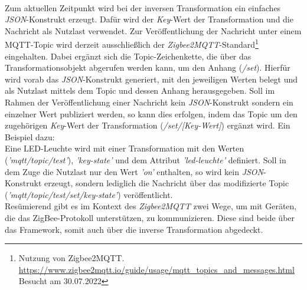     \\
    \linebreak
    Zum aktuellen Zeitpunkt wird bei der inversen Transformation ein einfaches \textit{JSON}-Konstrukt erzeugt. Dafür wird der 
    \textit{Key}-Wert der Transformation und die Nachricht als Nutzlast verwendet. Zur Veröffentlichung der Nachricht unter einem 
    \acs{MQTT}-Topic wird derzeit ausschließlich der \textit{Zigbee2MQTT}-Standard\footnote{Nutzung von Zigbee2MQTT. \url{https://www.zigbee2mqtt.io/guide/usage/mqtt_topics_and_messages.html} Besucht am 30.07.2022} 
    eingehalten. Dabei ergänzt sich die Topic-Zeichenkette, die über das Transformationsobjekt abgerufen werden kann, um den Anhang (\textit{/set}). 
    Hierfür wird vorab das \textit{JSON}-Konstrukt generiert, mit den jeweiligen Werten belegt und als Nutzlast mittels dem 
    Topic und dessen Anhang herausgegeben. Soll im Rahmen der Veröffentlichung einer Nachricht kein \textit{JSON}-Konstrukt sondern ein einzelner Wert 
    publiziert werden, so kann dies erfolgen, indem das Topic um den zugehörigen \textit{Key}-Wert der Transformation (\textit{/set/[Key-Wert]}) ergänzt wird. Ein Beispiel dazu:
    \\
    Eine LED-Leuchte wird mit einer Transformation mit den Werten (\textit{'mqtt/topic/test'}), \textit{'key-state'} und dem Attribut \textit{'led-leuchte'} 
    definiert. Soll in dem Zuge die Nutzlast nur den Wert \textit{'on'} enthalten, so wird kein 
    \textit{JSON}-Konstrukt erzeugt, sondern lediglich die Nachricht über das modifizierte Topic (\textit{'mqtt/topic/test/set/key-state'}) veröffentlicht. 
    \\
    \linebreak
    Resümierend gibt es im Kontext des \textit{Zigbee2MQTT} zwei Wege, um mit Geräten, die das ZigBee-Protokoll unterstützen, zu kommunizieren. Diese sind beide 
    über das Framework, somit auch über die inverse Transformation abgedeckt. 

%

